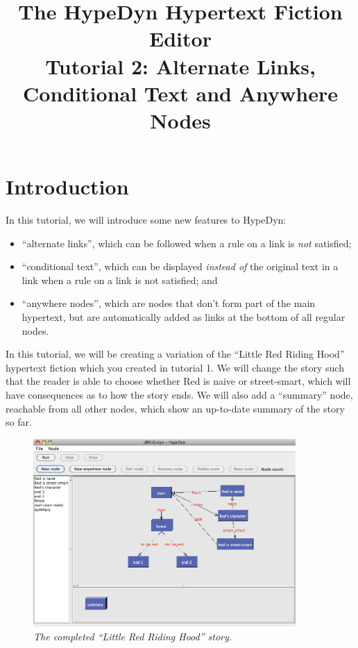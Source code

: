 \documentclass{article}
\begin{document}
\title{The HypeDyn Hypertext Fiction Editor\\Tutorial 2: Alternate Links,
Conditional Text and Anywhere Nodes}
\date{}

\onecolumn
\maketitle

\tableofcontents


\section{Introduction}
In this tutorial, we will introduce some new features to HypeDyn:

\begin{itemize}
  \item ``alternate links'', which can be followed when a rule on a link is
  \textit{not} satisfied;
  \item ``conditional text'', which can be displayed \textit{instead of} the
  original text in a link when a rule on a link is not satisfied; and
  \item ``anywhere nodes'', which are nodes that don't form part of the main
  hypertext, but are automatically added as links at the bottom of all regular
  nodes.
\end{itemize}

In this tutorial, we will be creating a variation of the ``Little Red
Riding Hood'' hypertext fiction which you created in tutorial 1. We will change
the story such that the reader is able to choose whether Red is naive or
street-smart, which will have consequences as to how the story ends. We will
also add a ``summary'' node, reachable from all other nodes, which show an
up-to-date summary of the story so far.


\begin{figure}[h]
  \centering
  \includegraphics[width=10cm]{images/hypedyn-tutorial-2-figure-1}
  \caption{\textit{The completed ``Little Red Riding Hood'' story.}}
\end{figure} 
\end{document}
